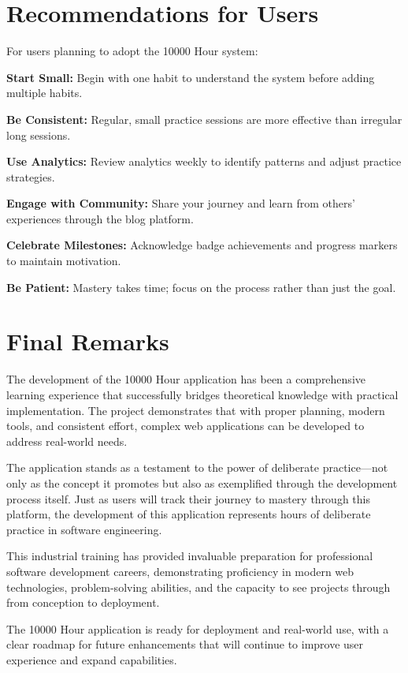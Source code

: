 \documentclass[12pt,a4paper]{report}
\newcommand{\JustifiedNormal}{\fontsize{12}{14}\selectfont\justifying\setlength{\parindent}{0pt}}
\begin{document}
\section{Recommendations for Users}
\JustifiedNormal
For users planning to adopt the 10000 Hour system:

\textbf{Start Small:} Begin with one habit to understand the system before adding multiple habits.

\textbf{Be Consistent:} Regular, small practice sessions are more effective than irregular long sessions.

\textbf{Use Analytics:} Review analytics weekly to identify patterns and adjust practice strategies.

\textbf{Engage with Community:} Share your journey and learn from others' experiences through the blog platform.

\textbf{Celebrate Milestones:} Acknowledge badge achievements and progress markers to maintain motivation.

\textbf{Be Patient:} Mastery takes time; focus on the process rather than just the goal.

\section{Final Remarks}
\JustifiedNormal
The development of the 10000 Hour application has been a comprehensive learning experience that successfully bridges theoretical knowledge with practical implementation. The project demonstrates that with proper planning, modern tools, and consistent effort, complex web applications can be developed to address real-world needs.

The application stands as a testament to the power of deliberate practice—not only as the concept it promotes but also as exemplified through the development process itself. Just as users will track their journey to mastery through this platform, the development of this application represents hours of deliberate practice in software engineering.

This industrial training has provided invaluable preparation for professional software development careers, demonstrating proficiency in modern web technologies, problem-solving abilities, and the capacity to see projects through from conception to deployment.

The 10000 Hour application is ready for deployment and real-world use, with a clear roadmap for future enhancements that will continue to improve user experience and expand capabilities.
\end{document}
